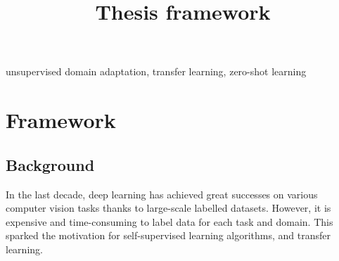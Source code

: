 \documentclass[conference]{IEEEtran}
\begin{document}

\title{Thesis framework\\ }

\author{
}


\maketitle

\begin{abstract}
\end{abstract}

\begin{IEEEkeywords}
unsupervised domain adaptation, transfer learning, zero-shot learning
\end{IEEEkeywords}

\section{Framework}

\subsection{Background}

In the last decade, deep learning has achieved great successes on various computer vision tasks thanks to large-scale labelled datasets. However, it is expensive and time-consuming to label data for each task and domain. This sparked the motivation for self-supervised learning algorithms, and transfer learning. 
\end{document}
